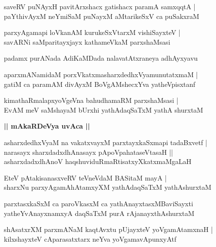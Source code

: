 \documentclass[twoside,12pt,openright]{book}
\newcounter{shloka}[chapter]
\def\uvaca#1{\centerline{{\large\textbf{#1}}}}
\begin{document}
\begin{shloka}
saveRV puNAyxH pavitArxshacx gatishacx paramA samxqqtA |\\
paYthivAyxM neYmiSaM puNayxM aMtarikeSxV ca puSakxraM  
\end{shloka}

\begin{shloka}
parxyAgamapi loVkanAM kurukeSxVtarxM vishiSayxteV |\\
savARNi saMparitayxjayx kathameVkaM parxshaMsasi
\end{shloka}

\begin{center}
padamx purANada AdiKaMDada nalavatAtxraneya adhAyxyavu 
\end{center}

\begin{shloka}
aparxmANamidaM porxVkatxmasharxdedhxVyamunutatxmaM |\\
gatiM ca paramAM divAyxM BoVgAMshecxYva yatheVpisxtanf 
\end{shloka}

\begin{shloka}
kimathaRmalapxyoVgeVna bahudhamaRM parxshaMsasi |\\
EvAM meV saMshayaM bUrxhi yathAdaqSaTxM yathA shurxtaM 
\end{shloka}

\uvaca{|| mAkaRDeVya uvAca ||}

\begin{shloka}
asharxdedhxVyaM na vakatxvayxM parxtayxkaSxmapi tadaBxvetf |\\
narasayx sharxdadxdhAnasayx pApoVpahataseVtasaH ||\\
asharxdadxdhAnoV haqshuviduRmaRtisatxyXkatxmaMgaLaH
\end{shloka}

\begin{shloka}
EteV pAtakisanasxveRV teVneVdaM BASitaM mayA |\\
sharxNu parxyAgamAhAtamxyXM yathAdaqSaTxM  yathAshurxtaM 
\end{shloka}

\begin{shloka}
parxtasxkaSxM ca paroVkasxM ca yathAnayxtasxMBaviSayxti \\
yatheYvAnayxnamxyA daqSaTxM purA rAjanayxthAshurxtaM 
\end{shloka}

\begin{shloka}
shAsatxrXM parxmANaM kaqtAvxtu pUjayxteV yoVgamAtamxnaH |\\
kilxshayxteV cAparasatxtarx neYva yoVgamavApunxyAtf 
\end{shloka}
\end{document}
